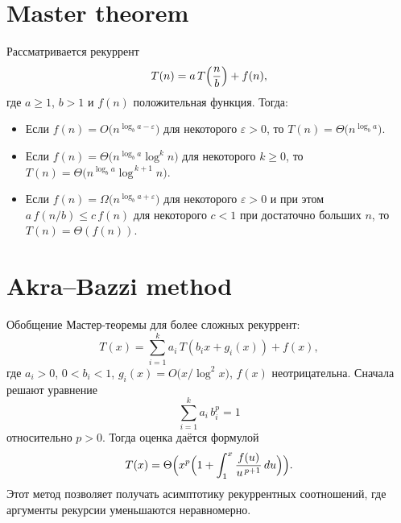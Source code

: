 \documentclass{article}
\begin{document}
	\section{Master theorem}
	Рассматривается рекуррент
	\[
	T(n)=a\,T\Bigl(\frac{n}{b}\Bigr) + f(n),
	\]
	где $a\ge1$, $b>1$ и $f(n)$ положительная функция. Тогда:
	\begin{itemize}
		\item Если $f(n) = O\bigl(n^{\log_b a - \varepsilon}\bigr)$ для некоторого $\varepsilon>0$, то $T(n) = \Theta\bigl(n^{\log_b a}\bigr)$.
		\item Если $f(n) = \Theta\bigl(n^{\log_b a}\log^k n\bigr)$ для некоторого $k\ge0$, то $T(n) = \Theta\bigl(n^{\log_b a}\log^{\,k+1}n\bigr)$.
		\item Если $f(n) = \Omega\bigl(n^{\log_b a + \varepsilon}\bigr)$ для некоторого $\varepsilon>0$ и при этом $a\,f(n/b) \le c\,f(n)$ для некоторого $c<1$ при достаточно больших $n$, то $T(n) = \Theta(f(n))$.
	\end{itemize}
	
	\section{Akra–Bazzi method}
	Обобщение Мастер-теоремы для более сложных рекуррент:
	\[
	T(x) = \sum_{i=1}^k a_i\,T(b_i x + g_i(x)) + f(x),
	\]
	где $a_i>0$, $0<b_i<1$, $g_i(x)=O\bigl(x/\log^2 x\bigr)$, $f(x)$ неотрицательна. Сначала решают уравнение 
	\[
	\sum_{i=1}^k a_i\,b_i^p = 1
	\]
	относительно $p>0$. Тогда оценка даётся формулой
	\[
	T(x) = \Theta\Bigl(x^p\Bigl(1 + \int_1^x \frac{f(u)}{u^{\,p+1}}\,du\Bigr)\Bigr).
	\]
	Этот метод позволяет получать асимптотику рекуррентных соотношений, где аргументы рекурсии уменьшаются неравномерно.
	
	
	
\end{document}
